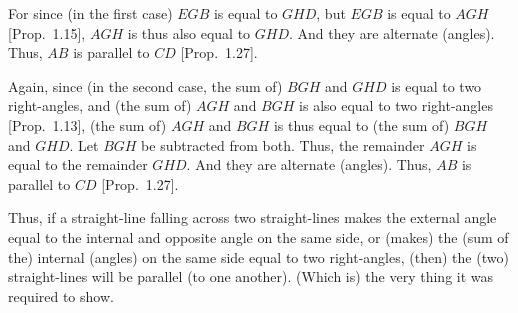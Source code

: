 \begin{Parallel}{}{}
{For since (in the first case) $EGB$ is equal to $GHD$, but $EGB$ is equal to $AGH$ [Prop.~1.15],
$AGH$ is thus also equal to $GHD$. And they are alternate (angles).
Thus, $AB$ is
 parallel to $CD$ [Prop.~1.27].

Again, since (in the second case, the sum of) $BGH$ and $GHD$ is equal to two right-angles,  and (the sum of) $AGH$ and
$BGH$ is also equal to two right-angles [Prop.~1.13], 
(the sum of) $AGH$ and $BGH$ is thus equal to (the sum of) $BGH$ and $GHD$. Let $BGH$ be
subtracted from both. Thus, the remainder $AGH$ is equal to the remainder
$GHD$. And they are alternate (angles). Thus, $AB$ is parallel
to $CD$ [Prop.~1.27].

\epsfysize=2.2in
\centerline{}

Thus, if a straight-line falling across  two straight-lines makes the external angle equal
to the internal and opposite angle on the same side, or (makes) the (sum of the) internal
(angles) on the same side equal
to two right-angles, (then) the (two) straight-lines will be parallel (to
one another). (Which is) the very thing it was required to show.}
\end{Parallel}

